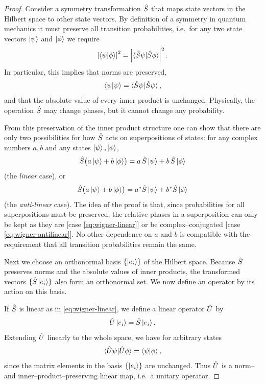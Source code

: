 \begin{proof}
    Consider a symmetry transformation $\hat{S}$ that maps state vectors in the Hilbert space to other state vectors. 
    By definition of a symmetry in quantum mechanics it must preserve all transition probabilities, i.e.\ for any two state vectors $\ket{\psi}$ and $\ket{\phi}$ we require
    \begin{align*}
        \left| \braket{\psi|\phi} \right|^2 = \left| \braket{\hat{S}\psi|\hat{S}\phi} \right|^2 .
    \end{align*}
    In particular, this implies that norms are preserved,
    \begin{align*}
        \braket{\psi|\psi} = \braket{\hat{S}\psi|\hat{S}\psi},
    \end{align*}
    and that the absolute value of every inner product is unchanged. 
    Physically, the operation $\hat{S}$ may change phases, but it cannot change any probability.

    From this preservation of the inner product structure one can show that there are only two possibilities for how $\hat{S}$ acts on superpositions of states: for any complex numbers $a,b$ and any states $\ket{\psi},\ket{\phi}$,
    \begin{align}
        \hat{S} \bigl(a \ket{\psi} + b \ket{\phi}\bigr)
        = a\, \hat{S} \ket{\psi} + b\, \hat{S} \ket{\phi}
        \label{eq:wigner-linear}
    \end{align}
    (the \emph{linear} case), or
    \begin{align}
        \hat{S} \bigl(a \ket{\psi} + b \ket{\phi}\bigr)
        = a^* \hat{S} \ket{\psi} + b^* \hat{S} \ket{\phi}
        \label{eq:wigner-antilinear}
    \end{align}
    (the \emph{anti-linear} case).  
    The idea of the proof is that, since probabilities for all superpositions must be preserved, the relative phases in a superposition can only be kept as they are [case \eqref{eq:wigner-linear}] or be complex–conjugated [case \eqref{eq:wigner-antilinear}]. 
    No other dependence on $a$ and $b$ is compatible with the requirement that all transition probabilities remain the same.

    Next we choose an orthonormal basis $\{\ket{e_i}\}$ of the Hilbert space.  
    Because $\hat{S}$ preserves norms and the absolute values of inner products, the transformed vectors $\{\hat{S}\ket{e_i}\}$ also form an orthonormal set. 
    We now define an operator by its action on this basis.

    If $\hat{S}$ is linear as in \eqref{eq:wigner-linear}, we define a linear operator $\hat{U}$ by
    \begin{align*}
        \hat{U} \ket{e_i} = \hat{S} \ket{e_i} .
    \end{align*}
    Extending $\hat{U}$ linearly to the whole space, we have for arbitrary states
    \begin{align*}
        \braket{\hat{U}\psi|\hat{U}\phi} = \braket{\psi|\phi},
    \end{align*}
    since the matrix elements in the basis $\{\ket{e_i}\}$ are unchanged. 
    Thus $\hat{U}$ is a norm– and inner–product–preserving linear map, i.e.\ a unitary operator.


\end{proof}
